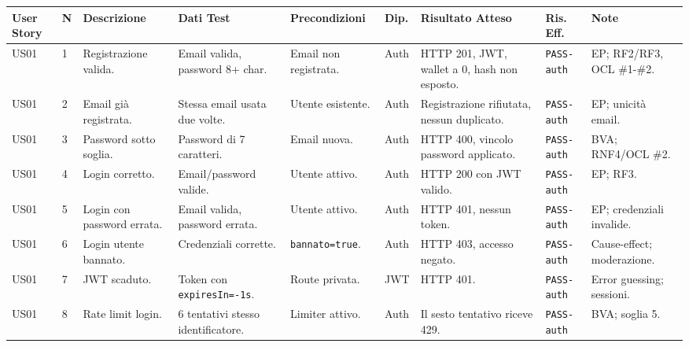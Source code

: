 \documentclass[11pt,a4paper]{article}
\newcommand{\code}[1]{\texttt{#1}}
\begin{document}
\renewcommand{\arraystretch}{1.12}
\setlength\tabcolsep{2pt}
\hfuzz=10pt
\tiny
\begin{longtable}{L{1.2cm}C{0.45cm}L{2.35cm}L{2.05cm}L{1.95cm}L{0.9cm}L{2.3cm}L{1.55cm}L{2.05cm}}
\toprule
\textbf{User Story} & \textbf{N} & \textbf{Descrizione} & \textbf{Dati Test} & \textbf{Precondizioni} & \textbf{Dip.} & \textbf{Risultato Atteso} & \textbf{Ris. Eff.} & \textbf{Note} \\
\midrule
\endhead
\bottomrule
\endfoot

US01 & 1 & Registrazione valida. & Email valida, password 8+ char. & Email non registrata. & Auth & HTTP 201, JWT, wallet a 0, hash non esposto. & \code{PASS-auth} & EP; RF2/RF3, OCL \#1-\#2. \\
US01 & 2 & Email già registrata. & Stessa email usata due volte. & Utente esistente. & Auth & Registrazione rifiutata, nessun duplicato. & \code{PASS-auth} & EP; unicità email. \\
US01 & 3 & Password sotto soglia. & Password di 7 caratteri. & Email nuova. & Auth & HTTP 400, vincolo password applicato. & \code{PASS-auth} & BVA; RNF4/OCL \#2. \\
US01 & 4 & Login corretto. & Email/password valide. & Utente attivo. & Auth & HTTP 200 con JWT valido. & \code{PASS-auth} & EP; RF3. \\
US01 & 5 & Login con password errata. & Email valida, password errata. & Utente attivo. & Auth & HTTP 401, nessun token. & \code{PASS-auth} & EP; credenziali invalide. \\
US01 & 6 & Login utente bannato. & Credenziali corrette. & \code{bannato=true}. & Auth & HTTP 403, accesso negato. & \code{PASS-auth} & Cause-effect; moderazione. \\
US01 & 7 & JWT scaduto. & Token con \code{expiresIn=-1s}. & Route privata. & JWT & HTTP 401. & \code{PASS-auth} & Error guessing; sessioni. \\
US01 & 8 & Rate limit login. & 6 tentativi stesso identificatore. & Limiter attivo. & Auth & Il sesto tentativo riceve 429. & \code{PASS-auth} & BVA; soglia 5. \\


\end{longtable}
\end{document}
